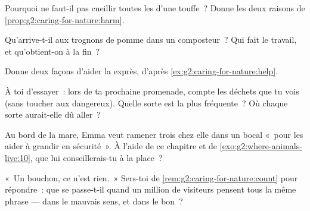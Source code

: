 \begin{exercise}[$\star$]\label{exo:g2:caring-for-nature:5}
Pourquoi ne faut-il pas cueillir toutes les  d'une touffe~?
Donne les deux raisons de \cref{prop:g2:caring-for-nature:harm}.
\end{exercise}

\begin{exercise}[$\star$]\label{exo:g2:caring-for-nature:6}
Qu'arrive-t-il aux trognons de pomme dans un composteur~? Qui fait
le travail, et qu'obtient-on à la fin~?
\end{exercise}

\begin{exercise}[$\star$]\label{exo:g2:caring-for-nature:7}
Donne deux façons d'aider la  exprès, d'après
\cref{ex:g2:caring-for-nature:help}.
\end{exercise}

\begin{exercise}[$\star$]\label{exo:g2:caring-for-nature:8}
À toi d'essayer~: lors de ta prochaine promenade, compte les déchets
que tu vois (sans toucher aux dangereux). Quelle sorte est la plus
fréquente~? Où chaque sorte aurait-elle dû aller~?
\end{exercise}

\begin{exercise}[$\star\star$]\label{exo:g2:caring-for-nature:9}
Au bord de la mare, Emma veut ramener trois  chez elle dans
un bocal «~pour les aider à grandir en sécurité~». À l'aide de ce
chapitre et de \cref{exo:g2:where-animals-live:10}, que lui
conseillerais-tu à la place~?
\end{exercise}

\begin{exercise}[$\star\star$]\label{exo:g2:caring-for-nature:10}
«~Un bouchon, ce n'est rien.~» Sers-toi de
\cref{rem:g2:caring-for-nature:count} pour répondre~: que se
passe-t-il quand un million de visiteurs pensent tous la même
phrase --- dans le mauvais sens, et dans le bon~?
\end{exercise}
